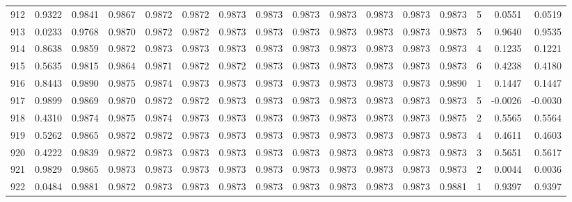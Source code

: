 \begin{tabular}{lrrrrrrrrrrrrrrr}
912 &      0.9322 &  0.9841 &  0.9867 &  0.9872 &  0.9872 &  0.9873 &  0.9873 &  0.9873 &  0.9873 &  0.9873 &   0.9873 &     0.9873 &      5 &                    0.0551 &                     0.0519 \\
913 &      0.0233 &  0.9768 &  0.9870 &  0.9872 &  0.9872 &  0.9873 &  0.9873 &  0.9873 &  0.9873 &  0.9873 &   0.9873 &     0.9873 &      5 &                    0.9640 &                     0.9535 \\
914 &      0.8638 &  0.9859 &  0.9872 &  0.9873 &  0.9873 &  0.9873 &  0.9873 &  0.9873 &  0.9873 &  0.9873 &   0.9873 &     0.9873 &      4 &                    0.1235 &                     0.1221 \\
915 &      0.5635 &  0.9815 &  0.9864 &  0.9871 &  0.9872 &  0.9872 &  0.9873 &  0.9873 &  0.9873 &  0.9873 &   0.9873 &     0.9873 &      6 &                    0.4238 &                     0.4180 \\
916 &      0.8443 &  0.9890 &  0.9875 &  0.9874 &  0.9873 &  0.9873 &  0.9873 &  0.9873 &  0.9873 &  0.9873 &   0.9873 &     0.9890 &      1 &                    0.1447 &                     0.1447 \\
917 &      0.9899 &  0.9869 &  0.9870 &  0.9872 &  0.9872 &  0.9873 &  0.9873 &  0.9873 &  0.9873 &  0.9873 &   0.9873 &     0.9873 &      5 &                   -0.0026 &                    -0.0030 \\
918 &      0.4310 &  0.9874 &  0.9875 &  0.9874 &  0.9873 &  0.9873 &  0.9873 &  0.9873 &  0.9873 &  0.9873 &   0.9873 &     0.9875 &      2 &                    0.5565 &                     0.5564 \\
919 &      0.5262 &  0.9865 &  0.9872 &  0.9872 &  0.9873 &  0.9873 &  0.9873 &  0.9873 &  0.9873 &  0.9873 &   0.9873 &     0.9873 &      4 &                    0.4611 &                     0.4603 \\
920 &      0.4222 &  0.9839 &  0.9872 &  0.9873 &  0.9873 &  0.9873 &  0.9873 &  0.9873 &  0.9873 &  0.9873 &   0.9873 &     0.9873 &      3 &                    0.5651 &                     0.5617 \\
921 &      0.9829 &  0.9865 &  0.9873 &  0.9873 &  0.9873 &  0.9873 &  0.9873 &  0.9873 &  0.9873 &  0.9873 &   0.9873 &     0.9873 &      2 &                    0.0044 &                     0.0036 \\
922 &      0.0484 &  0.9881 &  0.9872 &  0.9873 &  0.9873 &  0.9873 &  0.9873 &  0.9873 &  0.9873 &  0.9873 &   0.9873 &     0.9881 &      1 &                    0.9397 &                     0.9397 \\

\end{tabular}

